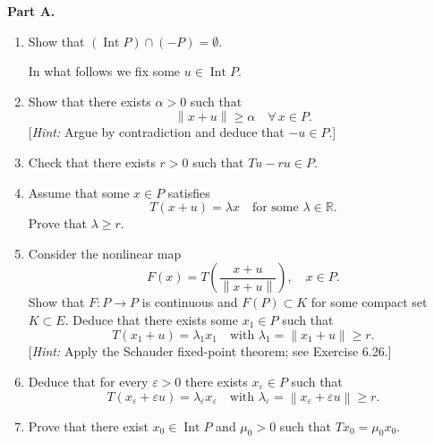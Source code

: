 \documentclass[12pt]{article}
\newcommand{\norm}[1]{\left\|#1\right\|}
\newcommand{\R}{\mathbb{R}}
\begin{document}
\noindent\textbf{Part A.}
 
\begin{enumerate}
\item Show that $(\operatorname{Int} P) \cap (-P) = \emptyset$.
 
 
In what follows we fix some $u \in \operatorname{Int} P$.
 
\item Show that there exists $\alpha > 0$ such that
\[
\norm{x + u} \ge \alpha \quad \forall\, x \in P.
\]
[\textit{Hint:} Argue by contradiction and deduce that $-u \in P$.]
 
\item Check that there exists $r > 0$ such that $Tu - ru \in P$.
 
\item Assume that some $x \in P$ satisfies
\[
T(x + u) = \lambda x \quad \text{for some } \lambda \in \R.
\]
Prove that $\lambda \ge r$.
 
\noindent[\textit{Hint:} It is convenient to introduce an order relation on $E$ defined by $y \ge z$ if
$y - z \in P$. Show by induction that $\bigl(\tfrac{\lambda}{r}\bigr)^n x \ge u$, $n = 1, 2, \ldots$]
 
\item Consider the nonlinear map
\[
F(x) = T\!\left(\frac{x + u}{\norm{x + u}}\right), \quad x \in P.
\]
Show that $F : P \to P$ is continuous and $F(P) \subset K$ for some compact set
$K \subset E$. Deduce that there exists some $x_1 \in P$ such that
\[
T(x_1 + u) = \lambda_1 x_1 \quad \text{with } \lambda_1 = \norm{x_1 + u} \ge r.
\]
[\textit{Hint:} Apply the Schauder fixed-point theorem; see Exercise 6.26.]
 
\item Deduce that for every $\varepsilon > 0$ there exists $x_\varepsilon \in P$ such that
\[
T(x_\varepsilon + \varepsilon u) = \lambda_\varepsilon x_\varepsilon \quad \text{with } \lambda_\varepsilon = \norm{x_\varepsilon + \varepsilon u} \ge r.
\]
 
\item Prove that there exist $x_0 \in \operatorname{Int} P$ and $\mu_0 > 0$ such that $Tx_0 = \mu_0 x_0$.
 
\end{enumerate}
 
\end{document}
